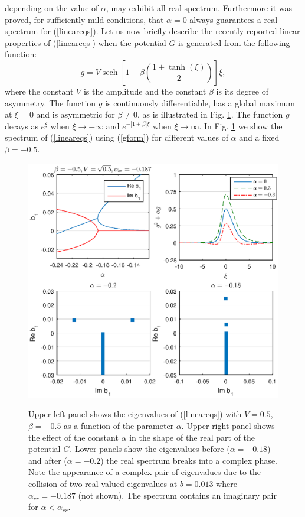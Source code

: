 \documentclass[aps,pre,showpacs,twocolumn]{revtex4}
\DeclareMathOperator{\sech}{sech}
\begin{document}
\noindent depending on the value of $\alpha$, may exhibit all-real spectrum. Furthermore it was proved, for sufficiently mild conditions, that $\alpha=0$ always guarantees a real spectrum for (\ref{lineareqs}). Let us now briefly describe the
recently reported \cite{moreira16} linear properties of (\ref{lineareqs}) when the potential $G$ is generated from the following function:
\begin{equation}
g=V\sech{\left[1+\beta\left(\frac{1+\tanh(\xi)}{2}\right)\right]\xi},
\label{gform}
\end{equation}
where the constant $V$ is the amplitude and the constant $\beta$ is its degree of asymmetry. The function $g$ is continuously differentiable, has a global maximum at $\xi=0$ and is asymmetric for $\beta\neq 0$, as is illustrated in Fig. \ref{fig:FF_phasebreak}. The function $g$ decays as $e^{\xi}$ when $\xi\to-\infty$ and $e^{-\left|1+\beta\right|\xi}$ when $\xi\to\infty$. In Fig.   \ref{fig:FF_phasebreak} we show the spectrum of (\ref{lineareqs}) using (\ref{gform}) for different values of $\alpha$ and a fixed $\beta=-0.5$.
\begin{figure}[!htb]
\begin{center}
\scalebox{.43} {\includegraphics{W_scan_V05_ds-05_insept_b1.eps}}
\end{center}
\caption{Upper left panel shows the eigenvalues of (\ref{lineareqs}) with $V=0.5$, $\beta=-0.5$ as a function of the parameter $\alpha$. Upper right panel shows the effect of the constant $\alpha$ in the shape of the real part of the potential $G$. Lower panels show the eigenvalues  before ($\alpha=-0.18$) and after ($\alpha=-0.2$) the real spectrum breaks into a complex phase. Note the appearance of a complex pair of eigenvalues due to the collision of two real valued eigenvalues at $b=0.013$ where $\alpha_{cr}=-0.187$ (not shown). The spectrum contains an imaginary pair for $\alpha<\alpha_{cr}$.}
\label{fig:FF_phasebreak}
\end{figure}
\end{document}
